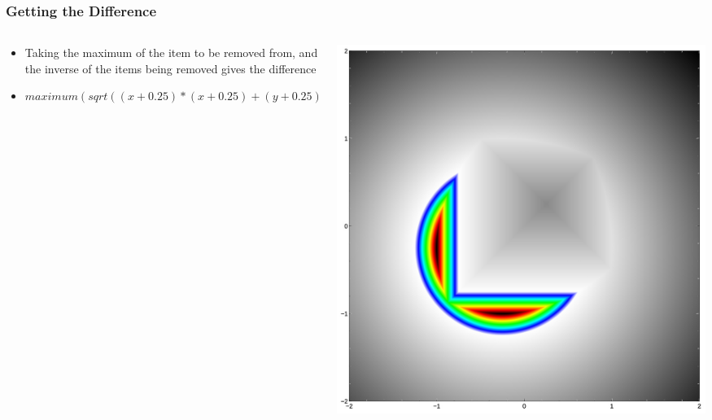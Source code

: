 \documentclass{beamer}
\begin{document}
\begin{frame}
\frametitle{Getting the Difference}
\begin{columns}
  \begin{column}{0.65\textwidth}
    \begin{itemize}
    \item Taking the maximum of the item to be removed from, and the inverse of the items being removed gives the difference
    \item $maximum(sqrt((x+0.25)*(x+0.25)+(y+0.25)*(y+0.25))-1,-(maximum(abs(x-0.25),abs(y-0.25)))-1)$
    \end{itemize}
  \end{column}
  \begin{column}{0.35\textwidth}
    \includegraphics[width=1.0\textwidth, right]{implicit_difference_square_circle.jpg}
  \end{column}
\end{columns}
\end{frame}
\end{document}

